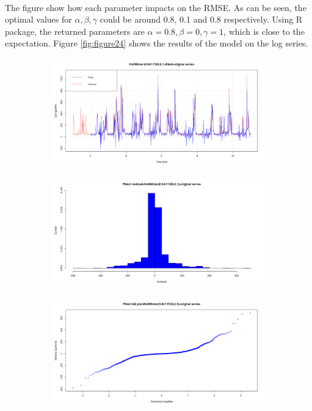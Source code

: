 \documentclass[12pt]{article}
\begin{document}
\paragraph{}
The figure show how each parameter impacts on the RMSE. As can be seen, the optimal values for $\alpha, \beta, \gamma$ could be around 0.8, 0.1 and 0.8 respectively. Using R package, the returned parameters are $\alpha=0.8,\beta=0,\gamma=1$, which is close to the expectation. Figure \ref{fig:figure24} shows the results of the model on the log series.
\begin{figure}[H]
  \centering
  \begin{subfigure}[b]{0.49\linewidth}
    \includegraphics[width=\linewidth]{figure23-1.png}
  \end{subfigure}
  \begin{subfigure}[b]{0.49\linewidth}
    \includegraphics[width=\linewidth]{figure23-2.png}
  \end{subfigure}
  \begin{subfigure}[b]{0.49\linewidth}
    \includegraphics[width=\linewidth]{figure23-3.png}

\end{subfigure}
\end{figure}
\end{document}
